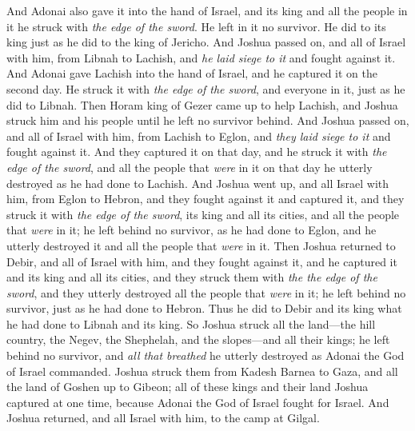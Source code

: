 \begin{biblechapter}
\verse And Adonai also gave it into the hand of Israel, and its king and all the people in it he struck with \textit{the edge of the sword}. He left in it no survivor. He did to its king just as he did to the king of Jericho.
\verse And Joshua passed on, and all of Israel with him, from Libnah to Lachish, and \textit{he laid siege to it} and fought against it.
\verse And Adonai gave Lachish into the hand of Israel, and he captured it on the second day. He struck it with \textit{the edge of the sword}, and everyone in it, just as he did to Libnah.
\verse Then Horam king of Gezer came up to help Lachish, and Joshua struck him and his people until he left no survivor behind.
\verse And Joshua passed on, and all of Israel with him, from Lachish to Eglon, and \textit{they laid siege to it} and fought against it.
\verse And they captured it on that day, and he struck it with \textit{the edge of the sword}, and all the people that \textit{were} in it on that day he utterly destroyed as he had done to Lachish.
\verse And Joshua went up, and all Israel with him, from Eglon to Hebron, and they fought against it
\verse and captured it, and they struck it with \textit{the edge of the sword}, its king and all its cities, and all the people that \textit{were} in it; he left behind no survivor, as he had done to Eglon, and he utterly destroyed it and all the people that \textit{were} in it.
\verse Then Joshua returned to Debir, and all of Israel with him, and they fought against it,
\verse and he captured it and its king and all its cities, and they struck them with \textit{the the edge of the sword}, and they utterly destroyed all the people that \textit{were} in it; he left behind no survivor, just as he had done to Hebron. Thus he did to Debir and its king what he had done to Libnah and its king.
\verse So Joshua struck all the land—the hill country, the Negev, the Shephelah, and the slopes—and all their kings; he left behind no survivor, and \textit{all that breathed} he utterly destroyed as Adonai the God of Israel commanded.
\verse Joshua struck them from Kadesh Barnea to Gaza, and all the land of Goshen up to Gibeon;
\verse all of these kings and their land Joshua captured at one time, because Adonai the God of Israel fought for Israel.
\verse And Joshua returned, and all Israel with him, to the camp at Gilgal.
\end{biblechapter}

